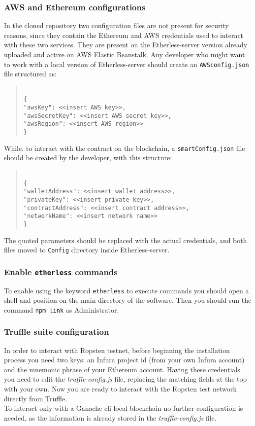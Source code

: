 \subsubsection{AWS and Ethereum configurations}
In the cloned repository two configuration files are not present for security reasons, since they contain the Ethereum and AWS credentials used to interact with these two services. They are present on the Etherless-server version already uploaded and active on AWS Elastic Beanstalk.
Any developer who might want to work with a local version of Etherless-server should create an \texttt{AWSconfig.json} file structured as:
\begin{quote}
\texttt{ \\
	\{\\
		"awsKey": <<insert AWS key>>, \\
		"awsSecretKey": <<insert AWS secret key>>, \\
		"awsRegion": <<insert AWS region>> \\
	\}\\
}
\end{quote}
While, to interact with the contract on the blockchain, a \texttt{smartConfig.json} file should be created by the developer, with this structure:
\begin{quote}
\texttt{ \\
	\{\\
	"walletAddress": <<insert wallet address>>, \\
	"privateKey": <<insert private key>>, \\
	"contractAddress": <<insert contract address>>, \\
	"networkName": <<insert network name>> \\
	\}\\
}
\end{quote}
The quoted parameters should be replaced with the actual credentials, and both files moved to \texttt{Config} directory inside Etherless-server.
\subsubsection{Enable \texttt{etherless} commands}
To enable using the keyword \texttt{etherless} to execute commands you should open a shell and position on the main directory of the software.
Then you should run the command \texttt{npm link} as Administrator.
\subsubsection{Truffle suite configuration}
	In order to interact with Ropsten testnet, before beginning the installation process you need two keys: an Infura project id (from your own Infura account) and the mnemonic phrase of your Ethereum account. Having these credentials you need to edit the \textit{truffle-config.js} file, replacing the matching fields at the top with your own. Now you are ready to interact with the Ropsten test network directly from Truffle.\\
	To interact only with a Ganache-cli local blockchain no further configuration is needed, as the information is already stored in the \textit{truffle-config.js} file.
